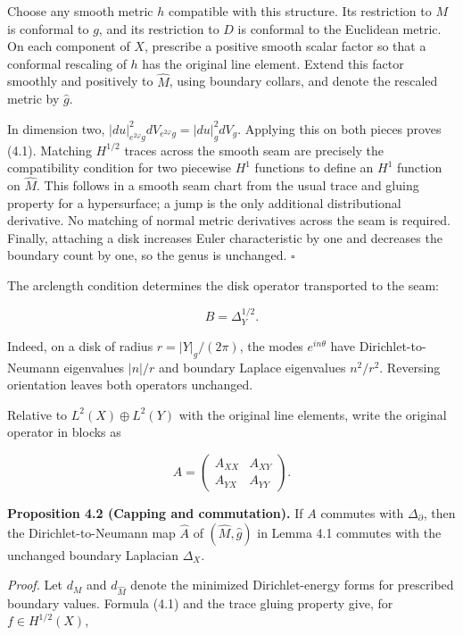 \documentclass[11pt]{article}
\begin{document}
Choose any smooth metric \(h\) compatible with this structure. Its
restriction to \(M\) is conformal to \(g\), and its restriction to \(D\)
is conformal to the Euclidean metric. On each component of \(X\),
prescribe a positive smooth scalar factor so that a conformal rescaling
of \(h\) has the original line element. Extend this factor smoothly and
positively to \(\widehat M\), using boundary collars, and denote the
rescaled metric by \(\widehat g\).

In dimension two,
\(|du|_{e^{2\varphi}g}^2dV_{e^{2\varphi}g}=|du|_g^2dV_g\). Applying this
on both pieces proves (4.1). Matching \(H^{1/2}\) traces across the
smooth seam are precisely the compatibility condition for two piecewise
\(H^1\) functions to define an \(H^1\) function on \(\widehat M\). This
follows in a smooth seam chart from the usual trace and gluing property
for a hypersurface; a jump is the only additional distributional
derivative. No matching of normal metric derivatives across the seam is
required. Finally, attaching a disk increases Euler characteristic by
one and decreases the boundary count by one, so the genus is unchanged.
\(\square\)

The arclength condition determines the disk operator transported to the
seam:

\[
B=\Delta_Y^{1/2}.
\tag{4.2}
\]

Indeed, on a disk of radius \(r=|Y|_g/(2\pi)\), the modes
\(e^{in\theta}\) have Dirichlet-to-Neumann eigenvalues \(|n|/r\) and
boundary Laplace eigenvalues \(n^2/r^2\). Reversing orientation leaves
both operators unchanged.

Relative to \(L^2(X)\oplus L^2(Y)\) with the original line elements,
write the original operator in blocks as

\[
A=\begin{pmatrix}A_{XX}&A_{XY}\\A_{YX}&A_{YY}\end{pmatrix}.
\tag{4.3}
\]

\textbf{Proposition 4.2 (Capping and commutation).} If \(A\) commutes
with \(\Delta_\partial\), then the Dirichlet-to-Neumann map
\(\widehat A\) of \((\widehat M,\widehat g)\) in Lemma 4.1 commutes with
the unchanged boundary Laplacian \(\Delta_X\).

\emph{Proof.} Let \(d_M\) and \(d_{\widehat M}\) denote the minimized
Dirichlet-energy forms for prescribed boundary values. Formula (4.1) and
the trace gluing property give, for \(f\in H^{1/2}(X)\),
\end{document}
